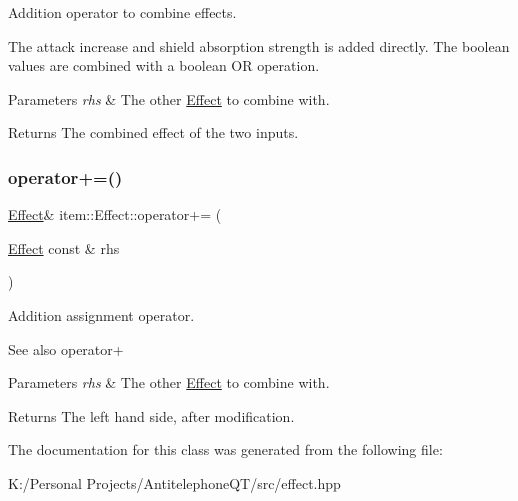 Addition operator to combine effects. 

The attack increase and shield absorption strength is added directly. The boolean values are combined with a boolean OR operation. 
\begin{DoxyParams}{Parameters}
{\em rhs} & The other {\ttfamily \hyperlink{classitem_1_1_effect}{Effect}} to combine with. \\
\hline
\end{DoxyParams}
\begin{DoxyReturn}{Returns}
The combined effect of the two inputs. 
\end{DoxyReturn}
\mbox{\label{classitem_1_1_effect_af0d65e5a848289bfd28bfe980da51915}} 
\subsubsection{\texorpdfstring{operator+=()}{operator+=()}}
{\footnotesize\ttfamily \hyperlink{classitem_1_1_effect}{Effect}\& item\+::\+Effect\+::operator+= (\begin{DoxyParamCaption}\item[{\hyperlink{classitem_1_1_effect}{Effect} const \&}]{rhs }\end{DoxyParamCaption})\hspace{0.3cm}{\ttfamily [inline]}}



Addition assignment operator. 

\begin{DoxySeeAlso}{See also}
operator+ 
\end{DoxySeeAlso}

\begin{DoxyParams}{Parameters}
{\em rhs} & The other {\ttfamily \hyperlink{classitem_1_1_effect}{Effect}} to combine with. \\
\hline
\end{DoxyParams}
\begin{DoxyReturn}{Returns}
The left hand side, after modification. 
\end{DoxyReturn}


The documentation for this class was generated from the following file\+:\begin{DoxyCompactItemize}
\item 
K\+:/\+Personal Projects/\+Antitelephone\+Q\+T/src/effect.\+hpp\end{DoxyCompactItemize}

